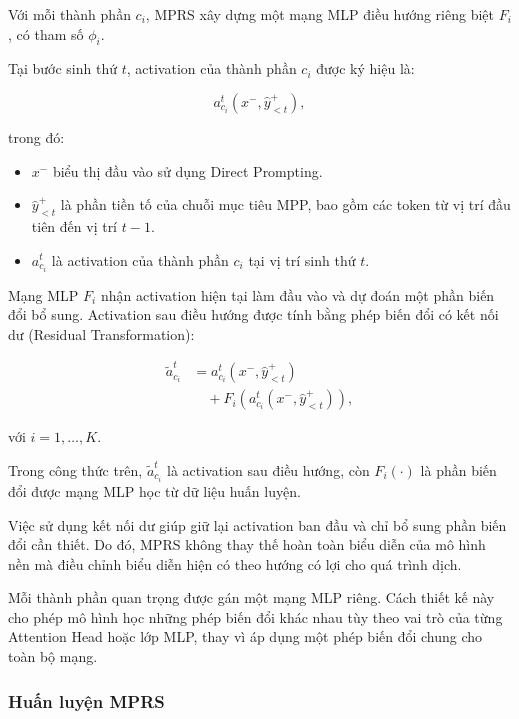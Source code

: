Với mỗi thành phần $c_i$, MPRS xây dựng một mạng MLP điều hướng riêng biệt $F_i$, có tham số $\phi_i$.

Tại bước sinh thứ $t$, activation của thành phần $c_i$ được ký hiệu là:

\begin{equation}
	a_{c_i}^{t}
	\left(x^-,\hat{y}_{<t}^{+}\right),
\end{equation}

trong đó:

\begin{itemize}
	\item $x^-$ biểu thị đầu vào sử dụng Direct Prompting.
	\item $\hat{y}_{<t}^{+}$ là phần tiền tố của chuỗi mục tiêu MPP, bao gồm các token từ vị trí đầu tiên đến vị trí $t-1$.
	\item $a_{c_i}^{t}$ là activation của thành phần $c_i$ tại vị trí sinh thứ $t$.
\end{itemize}

Mạng MLP $F_i$ nhận activation hiện tại làm đầu vào và dự đoán một phần biến đổi bổ sung. Activation sau điều hướng được tính bằng phép biến đổi có kết nối dư (Residual Transformation):

\begin{equation}
	\begin{aligned}
		\tilde{a}_{c_i}^{t}
		&=
		a_{c_i}^{t}
		\left(x^-,\hat{y}_{<t}^{+}\right)\\
		&\quad+
		F_i\left(
		a_{c_i}^{t}
		\left(x^-,\hat{y}_{<t}^{+}\right)
		\right),
	\end{aligned}
	\label{eq:mprs-training}
\end{equation}

với $i=1,\ldots,K$.

Trong công thức trên, $\tilde{a}_{c_i}^{t}$ là activation sau điều hướng, còn $F_i(\cdot)$ là phần biến đổi được mạng MLP học từ dữ liệu huấn luyện.

Việc sử dụng kết nối dư giúp giữ lại activation ban đầu và chỉ bổ sung phần biến đổi cần thiết. Do đó, MPRS không thay thế hoàn toàn biểu diễn của mô hình nền mà điều chỉnh biểu diễn hiện có theo hướng có lợi cho quá trình dịch.

Mỗi thành phần quan trọng được gán một mạng MLP riêng. Cách thiết kế này cho phép mô hình học những phép biến đổi khác nhau tùy theo vai trò của từng Attention Head hoặc lớp MLP, thay vì áp dụng một phép biến đổi chung cho toàn bộ mạng.

\subsubsection*{Huấn luyện MPRS}

